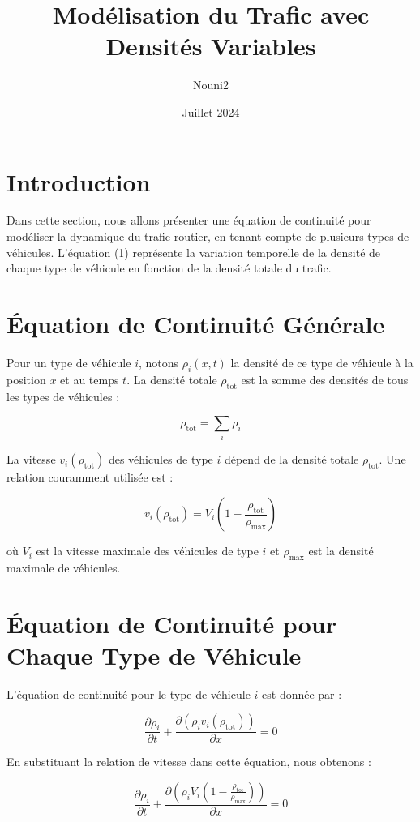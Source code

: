 \documentclass[a4paper,12pt]{article}
\title{Modélisation du Trafic avec Densités Variables}
\author{Nouni2}
\date{ Juillet 2024}
\begin{document}
\maketitle

\section{Introduction}

Dans cette section, nous allons présenter une équation de continuité pour modéliser la dynamique du trafic routier, en tenant compte de plusieurs types de véhicules. L'équation (1) représente la variation temporelle de la densité de chaque type de véhicule en fonction de la densité totale du trafic.

\section{Équation de Continuité Générale}

Pour un type de véhicule \(i\), notons \(\rho_i(x, t)\) la densité de ce type de véhicule à la position \(x\) et au temps \(t\). La densité totale \(\rho_{\text{tot}}\) est la somme des densités de tous les types de véhicules :

\[
\rho_{\text{tot}} = \sum_{i} \rho_i
\]

La vitesse \(v_i(\rho_{\text{tot}})\) des véhicules de type \(i\) dépend de la densité totale \(\rho_{\text{tot}}\). Une relation couramment utilisée est :

\[
v_i(\rho_{\text{tot}}) = V_i \left(1 - \frac{\rho_{\text{tot}}}{\rho_{\text{max}}}\right)
\]

où \(V_i\) est la vitesse maximale des véhicules de type \(i\) et \(\rho_{\text{max}}\) est la densité maximale de véhicules.

\section{Équation de Continuité pour Chaque Type de Véhicule}

L'équation de continuité pour le type de véhicule \(i\) est donnée par :

\[
\frac{\partial \rho_i}{\partial t} + \frac{\partial (\rho_i v_i(\rho_{\text{tot}}))}{\partial x} = 0
\]

En substituant la relation de vitesse dans cette équation, nous obtenons :

\[
\frac{\partial \rho_i}{\partial t} + \frac{\partial \left( \rho_i V_i \left( 1 - \frac{\rho_{\text{tot}}}{\rho_{\text{max}}} \right) \right)}{\partial x} = 0
\]
\end{document}
